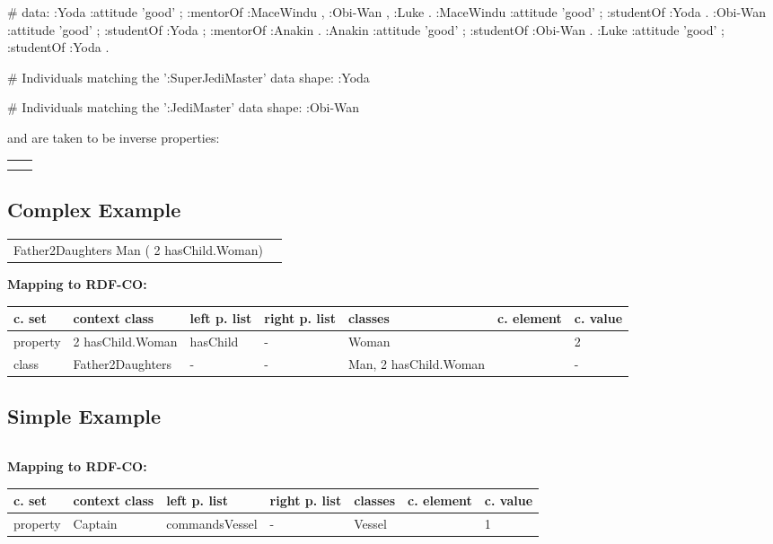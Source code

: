 \documentclass{llncs}
\newenvironment{gcotable}{
  \scriptsize
  \sffamily
  \vspace{0cm}
	\begin{center}
	\textbf{\vspace{0.4cm}Mapping to RDF-CO:} \\
  \begin{tabular}{l|l|l|l|l|l|l}
	\hline
  \textbf{c. set} & \textbf{context class} & \textbf{left p. list} & \textbf{right p. list} & \textbf{classes} & \textbf{c. element} & \textbf{c. value} \\
  \hline

}{
  \hline
  \end{tabular}
	\end{center}
}
\newenvironment{DL}{
\vspace{0cm}
	\begin{center}
  \begin{tabular}{r l}

}{
  \end{tabular}
	\end{center}
}
\begin{document}
\begin{ex}
# data:
:Yoda 
    :attitude 'good' ;
    :mentorOf :MaceWindu , :Obi-Wan , :Luke .
:MaceWindu
    :attitude 'good' ;
    :studentOf :Yoda .
:Obi-Wan 
    :attitude 'good' ;
    :studentOf :Yoda ;
    :mentorOf :Anakin .
:Anakin
    :attitude 'good' ; 
    :studentOf :Obi-Wan .
:Luke
    :attitude 'good' ;
    :studentOf :Yoda .
\end{ex}

\begin{ex}
# Individuals matching the ’:SuperJediMaster’ data shape:
:Yoda 

# Individuals matching the ’:JediMaster’ data shape:
:Obi-Wan
\end{ex}

\noindent  and  are taken to be inverse properties:\\

\begin{DL}
\\
 \\
\\

\end{DL}

\subsection{Complex Example}

\begin{DL}
Father2Daughters  Man  ( 2 hasChild.Woman)
\end{DL}

\begin{gcotable}
property &  2 hasChild.Woman & hasChild & - & Woman &  & 2 \\
class & Father2Daughters & - & - & Man,  2 hasChild.Woman &  & - \\
\end{gcotable}

\subsection{Simple Example}

\begin{DL}

\end{DL}

\begin{gcotable}
property & Captain & commandsVessel & - & Vessel &  & 1 \\
\end{gcotable}
\end{document}
